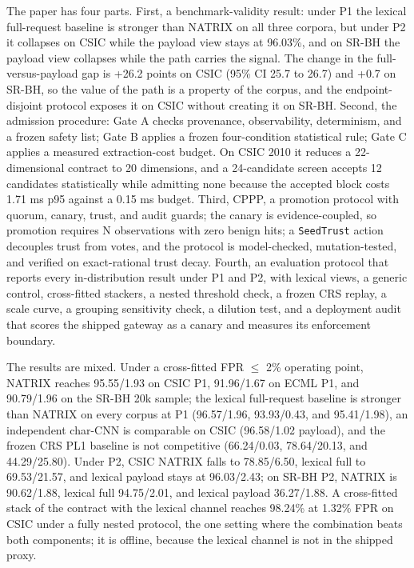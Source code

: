 \documentclass[preprint,11pt]{elsarticle}
\begin{document}
The paper has four parts. First, a benchmark-validity result: under P1
the lexical full-request baseline is stronger than NATRIX on all three
corpora, but under P2 it collapses on CSIC while the payload view stays
at 96.03\%, and on SR-BH the payload view collapses while the path
carries the signal. The change in the full-versus-payload gap is +26.2
points on CSIC (95\% CI 25.7 to 26.7) and +0.7 on SR-BH, so the value of
the path is a property of the corpus, and the endpoint-disjoint protocol
exposes it on CSIC without creating it on SR-BH. Second, the admission
procedure: Gate A checks provenance, observability, determinism, and a
frozen safety list; Gate B applies a frozen four-condition statistical
rule; Gate C applies a measured extraction-cost budget. On CSIC 2010 it
reduces a 22-dimensional contract to 20 dimensions, and a 24-candidate
screen accepts 12 candidates statistically while admitting none because
the accepted block costs 1.71 ms p95 against a 0.15 ms budget. Third,
CPPP, a promotion protocol with quorum, canary, trust, and audit guards;
the canary is evidence-coupled, so promotion requires N observations
with zero benign hits; a \texttt{Seed\allowbreak{}Trust} action decouples trust from
votes, and the protocol is model-checked, mutation-tested, and verified
on exact-rational trust decay. Fourth, an evaluation protocol that
reports every in-distribution result under P1 and P2, with lexical
views, a generic control, cross-fitted stackers, a nested threshold
check, a frozen CRS replay, a scale curve, a grouping sensitivity check,
a dilution test, and a deployment audit that scores the shipped gateway
as a canary and measures its enforcement boundary.

The results are mixed. Under a cross-fitted FPR $\le$ 2\% operating
point, NATRIX reaches 95.55/1.93 on CSIC P1, 91.96/1.67 on ECML P1, and
90.79/1.96 on the SR-BH 20k sample; the lexical full-request baseline is
stronger than NATRIX on every corpus at P1 (96.57/1.96, 93.93/0.43, and
95.41/1.98), an independent char-CNN is comparable on CSIC (96.58/1.02
payload), and the frozen CRS PL1 baseline is not competitive
(66.24/0.03, 78.64/20.13, and 44.29/25.80). Under P2, CSIC NATRIX falls
to 78.85/6.50, lexical full to 69.53/21.57, and lexical payload stays at
96.03/2.43; on SR-BH P2, NATRIX is 90.62/1.88, lexical full 94.75/2.01,
and lexical payload 36.27/1.88. A cross-fitted stack of the contract
with the lexical channel reaches 98.24\% at 1.32\% FPR on CSIC under a
fully nested protocol, the one setting where the combination beats both
components; it is offline, because the lexical channel is not in the
shipped proxy.
\end{document}
